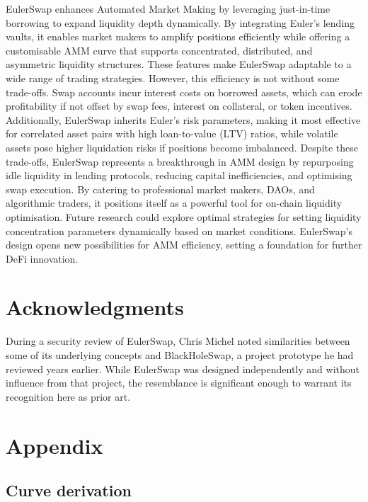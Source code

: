 \documentclass{article}
\begin{document}
EulerSwap enhances Automated Market Making by leveraging just-in-time borrowing to expand liquidity depth dynamically. By integrating Euler’s lending vaults, it enables market makers to amplify positions efficiently while offering a customisable AMM curve that supports concentrated, distributed, and asymmetric liquidity structures. These features make EulerSwap adaptable to a wide range of trading strategies. However, this efficiency is not without some trade-offs. Swap accounts incur interest costs on borrowed assets, which can erode profitability if not offset by swap fees, interest on collateral, or token incentives. Additionally, EulerSwap inherits Euler’s risk parameters, making it most effective for correlated asset pairs with high loan-to-value (LTV) ratios, while volatile assets pose higher liquidation risks if positions become imbalanced. Despite these trade-offs, EulerSwap represents a breakthrough in AMM design by repurposing idle liquidity in lending protocols, reducing capital inefficiencies, and optimising swap execution. By catering to professional market makers, DAOs, and algorithmic traders, it positions itself as a powerful tool for on-chain liquidity optimisation. Future research could explore optimal strategies for setting liquidity concentration parameters dynamically based on market conditions. EulerSwap's design opens new possibilities for AMM efficiency, setting a foundation for further DeFi innovation.

\section*{Acknowledgments}

During a security review of EulerSwap, Chris Michel noted similarities between some of its underlying concepts and BlackHoleSwap, a project prototype he had reviewed years earlier. While EulerSwap was designed independently and without influence from that project, the resemblance is significant enough to warrant its recognition here as prior art.

\newpage
\section{Appendix}
\label{sec:appendix}

\subsection{Curve derivation}
\label{sec:curve-derivation}
\end{document}
